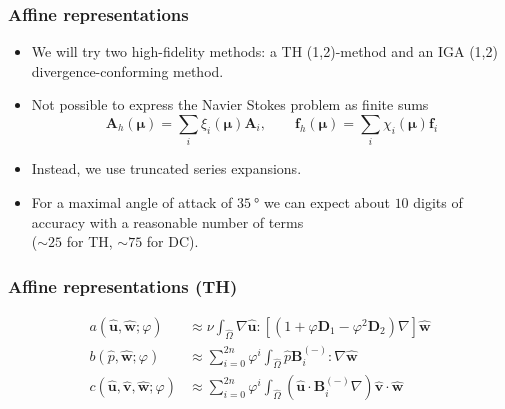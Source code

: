 \documentclass{beamer}
\begin{document}
\begin{frame}
  \frametitle{Affine representations}

  \begin{itemize}
  \item We will try two high-fidelity methods: a TH (1,2)-method and an IGA (1,2)
    divergence-conforming method.
  \item Not possible to express the Navier Stokes problem as finite sums
    \[
      \bm A_h(\bm \mu) = \textstyle \sum_i \xi_i(\bm \mu) \bm A_i, \qquad
      \bm f_h(\bm \mu) = \textstyle \sum_i \chi_i(\bm \mu) \bm f_i
    \]
  \item Instead, we use truncated series expansions.
  \item For a maximal angle of attack of $\SI{35}{\degree}$ we can expect about $10$ digits of
    accuracy with a reasonable number of terms \\ ($\sim 25$ for TH, $\sim 75$ for DC).
  \end{itemize}
\end{frame}

\begin{frame}
  \frametitle{Affine representations (TH)}

  \begin{align*}
    a(\hat{\bm u}, \hat{\bm w}; \varphi) &\approx \nu \int_{\hat{\Omega}}
      \nabla \hat{\bm u} : \left[ (1 + \varphi \bm D_1 - \varphi^2 \bm D_2) \nabla \right] \hat{\bm w} \\
    b(\hat{p}, \hat{\bm w}; \varphi) &\approx \sum_{i=0}^{2n} \varphi^i
    \int_{\hat{\Omega}} \hat{p} \bm B^{(-)}_i : \nabla \hat{\bm w} \\
  c(\hat{\bm u}, \hat{\bm v}, \hat{\bm w}; \varphi)
  &\approx \sum_{i=0}^{2n} \varphi^i \int_{\hat{\Omega}}
    (\hat{\bm u} \cdot \bm B^{(-)}_i \nabla) \hat{\bm v} \cdot \hat{\bm w}
  \end{align*}
\end{frame}
\end{document}
